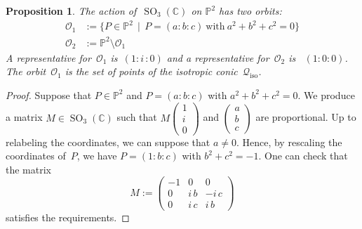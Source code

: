 \documentclass[a4paper, 11pt, reqno]{amsart}
\theoremstyle{plain}
\newtheorem{prop}[lemma]{Proposition}
\theoremstyle{definition}
\newcommand{\C}{\mathbb{C}}
\newcommand{\p}{\mathbb{P}}
\newcommand{\iii}{\textit{i}\,}
\newcommand{\iso}{\mathcal{Q}_{\mathrm{iso}}}
\newcommand{\SO}{\operatorname{SO}}
\begin{document}
\begin{prop}
\label{two_orbits}
The action of~$\SO_3(\C)$ on $\p^2$ has two orbits:
%
\begin{align*}
  \mathcal{O}_1 &:=
  \bigl\{
    P \in \p^2 \, \mid \,
    P = (a:b:c) \ \text{with} \ a^2 + b^2 + c^2 = 0
  \bigr\} \\
  \mathcal{O}_2 &:= \p^2 \setminus \mathcal{O}_1
\end{align*}
%
A representative for~$\mathcal{O}_1$ is~$(1:\iii:0)$ and a
representative for~$\mathcal{O}_2$ is~ $(1:0:0)$.
The orbit~$\mathcal{O}_1$ is the set of points of the isotropic conic~$\iso$.
\end{prop}
\begin{proof}
Suppose that $P \in \p^2$ and $P = (a:b:c)$ with $a^2 + b^2 + c^2 = 0$.
We produce a matrix $M \in \SO_3(\C)$ such that $M \left(\begin{smallmatrix} 1 \\ \iii \\ 0 \end{smallmatrix}\right)$ and $\left(\begin{smallmatrix} a \\ b \\ c \end{smallmatrix}\right)$ are proportional.
Up to relabeling the coordinates, we can suppose that $a \neq 0$.
Hence, by rescaling the coordinates of~$P$, we have $P = (1: b: c)$ with $b^2 + c^2 = -1$.
One can check that the matrix
%
\[
  M :=
  \begin{pmatrix}
    -1 & 0 & 0 \\
    0 & \iii b & -\iii c \\
    0 & \iii c & \iii b
  \end{pmatrix}
\]
%
satisfies the requirements.


\end{proof}
\end{document}
